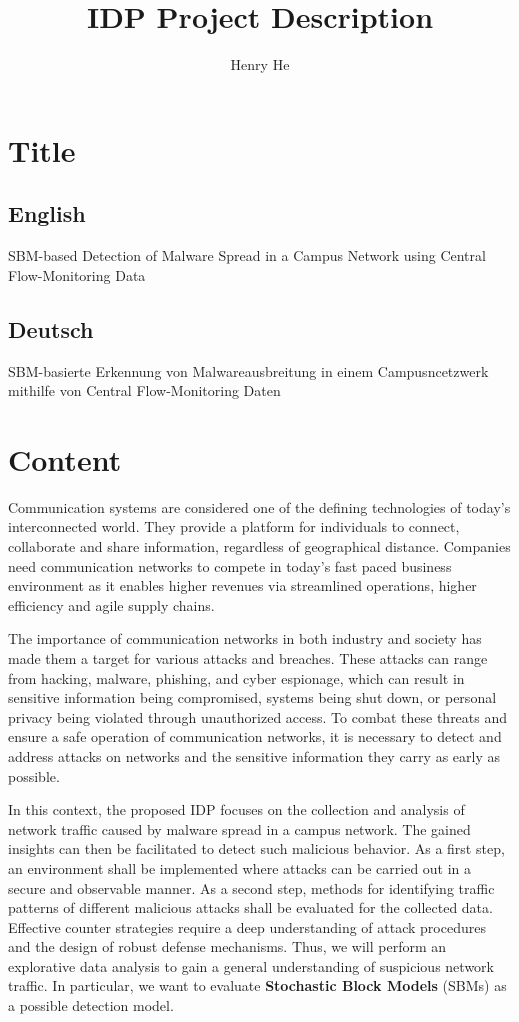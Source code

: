 \documentclass[paper=a4]{scrartcl}
\title{IDP Project Description}
\author{Henry He}
\begin{document}
\maketitle

\section{Title}
\subsection*{English}
SBM-based Detection of Malware Spread in a Campus Network using Central
Flow-Monitoring Data

\subsection*{Deutsch}
SBM-basierte Erkennung von Malwareausbreitung in einem Campusncetzwerk mithilfe
von Central Flow-Monitoring Daten

\section{Content}
Communication systems are considered one of the defining technologies of today's
interconnected world. They provide a platform for individuals to connect,
collaborate and share information, regardless of geographical distance.
Companies need communication networks to compete in today's fast paced business
environment as it enables higher revenues via streamlined operations, higher
efficiency and agile supply chains. 

The importance of communication networks in both industry and society has made
them a target for various attacks and breaches. These attacks can range from
hacking, malware, phishing, and cyber espionage, which can result in sensitive
information being compromised, systems being shut down, or personal privacy
being violated through unauthorized access. To combat these threats and ensure a
safe operation of communication networks, it is necessary to detect and address
attacks on networks and the sensitive information they carry as early as
possible. 

In this context, the proposed IDP focuses on the collection and analysis of
network traffic caused by malware spread in a campus network. The gained
insights can then be facilitated to detect such malicious behavior. As a first
step, an environment shall be implemented where attacks can be carried out in a
secure and observable manner. As a second step, methods for identifying traffic
patterns of different malicious attacks shall be evaluated for the collected
data. Effective counter strategies require a deep understanding of attack
procedures and the design of robust defense mechanisms. Thus, we will perform an
explorative data analysis to gain a general understanding of suspicious network
traffic. In particular, we want to evaluate \textbf{Stochastic Block Models}
(SBMs) as a possible detection model.
\end{document}
